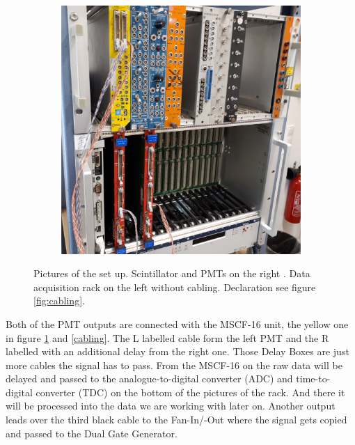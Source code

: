 \documentclass[]{article}
\begin{document}
\begin{figure}[H]
\begin{subfigure}[h]{0.59\textwidth}
\includegraphics[width=1\textwidth]{Plots/Raw.jpg}
\end{subfigure}
\caption{Pictures of the set up. Scintillator and PMTs on the right \cite{script}. Data acquisition rack on the left without cabling. Declaration see figure \ref{fig:cabling}.}
\label{fig:setup}
\end{figure}

Both of the PMT outputs are connected with the MSCF-16 unit, the yellow one in figure \ref{fig:setup} and \ref{cabling}. The L labelled cable form the left PMT and the R labelled with an additional delay from the right one. Those Delay Boxes are just more cables the signal has to pass. From the MSCF-16 on the raw data will be delayed and passed to the analogue-to-digital converter (ADC) and time-to-digital converter (TDC) on the bottom of the pictures of the rack. And there it will be processed into the data we are working with later on. Another output leads over the third black cable to the Fan-In/-Out where the signal gets copied and passed to the Dual Gate Generator.

\end{document}
